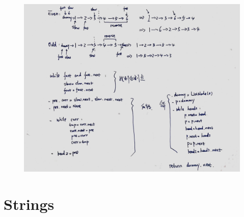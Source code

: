 \documentclass[a4paper,10pt]{article}
\begin{document}
\begin{figure}[h]
    \includegraphics[width=\textwidth]{leetcode143.jpg}
    \centering \\
\end{figure}









\section{Strings}
\end{document}
